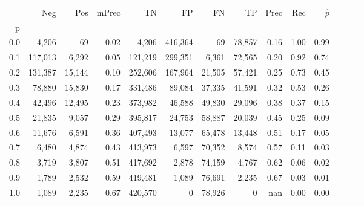 \begin{tabular}{rrrrrrrrrrrrrr}
\toprule
{} &      Neg &     Pos & mPrec &       TN &       FP &      FN &      TP &  Prec &   Rec & $\hat{p}$ \\
p   &          &         &       &          &          &         &         &       &       &           \\
\midrule
0.0 &    4,206 &      69 &  0.02 &    4,206 &  416,364 &      69 &  78,857 &  0.16 &  1.00 &      0.99 \\
0.1 &  117,013 &   6,292 &  0.05 &  121,219 &  299,351 &   6,361 &  72,565 &  0.20 &  0.92 &      0.74 \\
0.2 &  131,387 &  15,144 &  0.10 &  252,606 &  167,964 &  21,505 &  57,421 &  0.25 &  0.73 &      0.45 \\
0.3 &   78,880 &  15,830 &  0.17 &  331,486 &   89,084 &  37,335 &  41,591 &  0.32 &  0.53 &      0.26 \\
0.4 &   42,496 &  12,495 &  0.23 &  373,982 &   46,588 &  49,830 &  29,096 &  0.38 &  0.37 &      0.15 \\
0.5 &   21,835 &   9,057 &  0.29 &  395,817 &   24,753 &  58,887 &  20,039 &  0.45 &  0.25 &      0.09 \\
0.6 &   11,676 &   6,591 &  0.36 &  407,493 &   13,077 &  65,478 &  13,448 &  0.51 &  0.17 &      0.05 \\
0.7 &    6,480 &   4,874 &  0.43 &  413,973 &    6,597 &  70,352 &   8,574 &  0.57 &  0.11 &      0.03 \\
0.8 &    3,719 &   3,807 &  0.51 &  417,692 &    2,878 &  74,159 &   4,767 &  0.62 &  0.06 &      0.02 \\
0.9 &    1,789 &   2,532 &  0.59 &  419,481 &    1,089 &  76,691 &   2,235 &  0.67 &  0.03 &      0.01 \\
1.0 &    1,089 &   2,235 &  0.67 &  420,570 &        0 &  78,926 &       0 &   nan &  0.00 &      0.00 \\
\bottomrule
\end{tabular}
